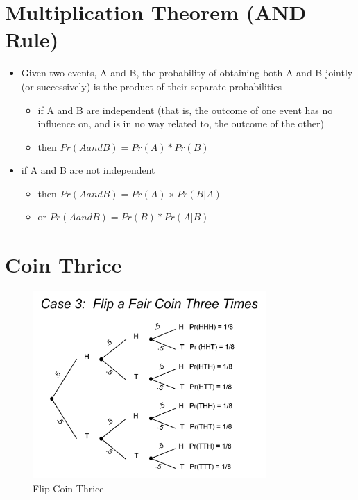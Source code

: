 \documentclass[12pt]{article}
\begin{document}
\section{Multiplication Theorem (AND
Rule)}\label{multiplication-theorem-and-rule}

\begin{itemize}
\itemsep1pt\parskip0pt
\item
  Given two events, A and B, the probability of obtaining both A and B
  jointly (or successively) is the product of their separate
  probabilities

  \begin{itemize}
  \itemsep1pt\parskip0pt
  \item
    if A and B are independent (that is, the outcome of one event has no
    influence on, and is in no way related to, the outcome of the other)
  \item
    then \(Pr(A and B) = Pr(A) * Pr(B)\)
  \end{itemize}
\item
  if A and B are not independent

  \begin{itemize}
  \itemsep1pt\parskip0pt
  \item
    then \(Pr(A and B) = Pr(A) × Pr(B|A)\)
  \item
    or \(Pr(A and B)= Pr(B) * Pr(A|B)\)
  \end{itemize}
\end{itemize}

\section{Coin Thrice}\label{coin-thrice}

\begin{figure}[H]
\centering
\includegraphics[width=3.5in]{coin_three.png}
\caption{Flip Coin Thrice}
\end{figure}
\end{document}

